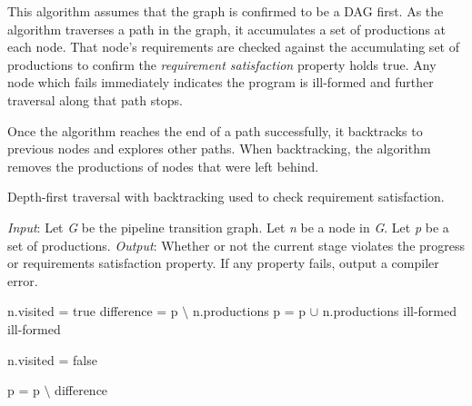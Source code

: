 This algorithm assumes that the graph is confirmed to be a DAG first.
As the algorithm traverses a path in the graph, it accumulates a set of productions at each node. That node's requirements are checked against the accumulating set of productions to confirm the \textit{requirement satisfaction} property holds true. Any node which fails immediately indicates the program is ill-formed and further traversal along that path stops.


Once the algorithm reaches the end of a path successfully, it backtracks to previous
nodes and explores other paths. When backtracking, the algorithm removes the productions of nodes that were left behind.

\begin{algorithm}[ht]
 \caption{Depth-first traversal with backtracking used to check requirement satisfaction.}
 \label{alg:dfs}
 \begin{algorithmic}
 \State
 \State \textit{Input}: Let \textit{G} be the pipeline transition graph. Let \textit{n} be a node in \textit{G}. Let \textit{p} be a set of productions.
 \State \textit{Output}: Whether or not the current stage violates the progress or requirements satisfaction property. If any property fails, output a compiler error.
 \State

 	\State n.visited = true
 	\State difference = p $\setminus$ n.productions
 	\State p = p $\cup$ n.productions
 	 
 				\State {}
 			\Else
 				\State \Return ill-formed
 			\EndIf
 		\EndFor
	\Else
 		\State \Return ill-formed
 	\EndIf
 	
	
 	\State n.visited = false 

 	\State p = p $\setminus$ difference 
 \EndFunction
 \end{algorithmic}

\end{algorithm}

